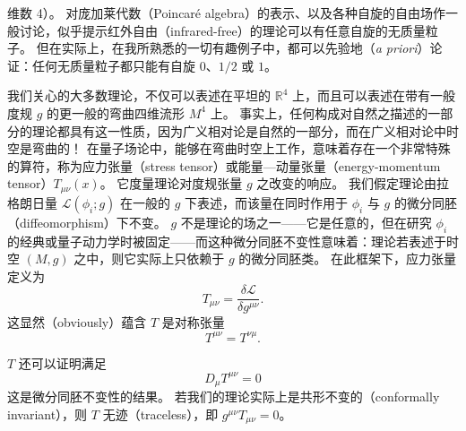 
维数 4）。
对庞加莱代数（Poincaré algebra）的表示、以及各种自旋的自由场作一般讨论，似乎提示红外自由（infrared-free）的理论可以有任意自旋的无质量粒子。
但在实际上，在我所熟悉的一切有趣例子中，都可以先验地（\textit{a priori}）论证：任何无质量粒子都只能有自旋 $0$、$1/2$ 或 $1$。

我们关心的大多数理论，不仅可以表述在平坦的 $\mathbb{R}^4$ 上，而且可以表述在带有一般度规 $g$ 的更一般的弯曲四维流形 $M^4$ 上。
事实上，任何构成对自然之描述的一部分的理论都具有这一性质，因为广义相对论是自然的一部分，而在广义相对论中时空是弯曲的！
在量子场论中，能够在弯曲时空上工作，意味着存在一个非常特殊的算符，称为应力张量（stress tensor）或能量—动量张量（energy-momentum tensor）$T_{\mu\nu}(x)$。
它度量理论对度规张量 $g$ 之改变的响应。
我们假定理论由拉格朗日量 $\mathcal{L}(\phi_i;g)$ 在一般的 $g$ 下表述，而该量在同时作用于 $\phi_i$ 与 $g$ 的微分同胚（diffeomorphism）下不变。
$g$ 不是理论的场之一——它是任意的，但在研究 $\phi_i$ 的经典或量子动力学时被固定——而这种微分同胚不变性意味着：理论若表述于时空 $(M,g)$ 之中，则它实际上只依赖于 $g$ 的微分同胚类。
在此框架下，应力张量定义为
\[
  T_{\mu\nu}=\frac{\delta\mathcal{L}}{\delta g^{\mu\nu}}.
\]
这显然（obviously）蕴含 $T$ 是对称张量
\[
  T^{\mu\nu}=T^{\nu\mu}.
\]


$T$ 还可以证明满足
\[
  D_\mu T^{\mu\nu}=0
\]
这是微分同胚不变性的结果。
若我们的理论实际上是共形不变的（conformally invariant），则 $T$ 无迹（traceless），即 $g^{\mu\nu}T_{\mu\nu}=0$。


